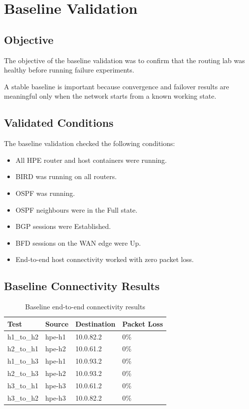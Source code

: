 \section{Baseline Validation}

\subsection{Objective}

The objective of the baseline validation was to confirm that the routing lab was healthy before running failure experiments.

A stable baseline is important because convergence and failover results are meaningful only when the network starts from a known working state.

\subsection{Validated Conditions}

The baseline validation checked the following conditions:

\begin{itemize}
    \item All HPE router and host containers were running.
    \item BIRD was running on all routers.
    \item OSPF was running.
    \item OSPF neighbours were in the Full state.
    \item BGP sessions were Established.
    \item BFD sessions on the WAN edge were Up.
    \item End-to-end host connectivity worked with zero packet loss.
\end{itemize}

\subsection{Baseline Connectivity Results}

\begin{table}[h]
\centering
\begin{tabular}{|l|l|l|l|}
\hline
\textbf{Test} & \textbf{Source} & \textbf{Destination} & \textbf{Packet Loss} \\
\hline
h1\_to\_h2 & hpe-h1 & 10.0.82.2 & 0\% \\
h2\_to\_h1 & hpe-h2 & 10.0.61.2 & 0\% \\
h1\_to\_h3 & hpe-h1 & 10.0.93.2 & 0\% \\
h2\_to\_h3 & hpe-h2 & 10.0.93.2 & 0\% \\
h3\_to\_h1 & hpe-h3 & 10.0.61.2 & 0\% \\
h3\_to\_h2 & hpe-h3 & 10.0.82.2 & 0\% \\
\hline
\end{tabular}
\caption{Baseline end-to-end connectivity results}
\end{table}

